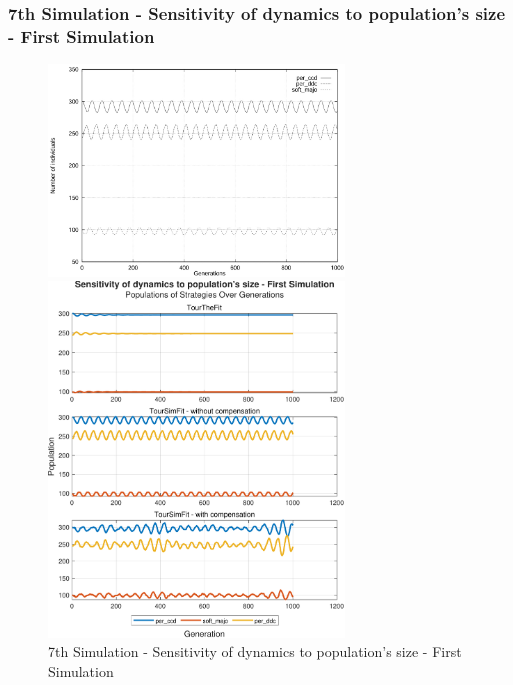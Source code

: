 \documentclass[12pt]{article}
\begin{document}
\subsubsection{7th Simulation - Sensitivity of dynamics to population's size - First Simulation}
	\begin{figure}[h]
	    \centering
		\includegraphics[width=0.7\textwidth]{RefPaperFigures/fig7a.jpeg}\par\vspace{0.5em}
	    \includegraphics[width=0.7\textwidth]{Sensitivity of dynamics to population's size - First Simulation.pdf}
	    \caption{7th Simulation - Sensitivity of dynamics to population's size - First Simulation}
	    \label{fig:Sensitivity of dynamics to population's size - First Simulation}
	\end{figure}
\end{document}
